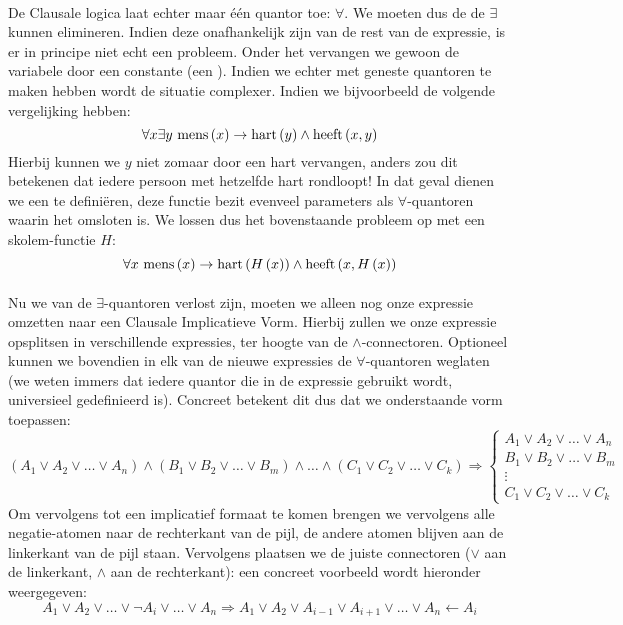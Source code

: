 \paragraph{}De Clausale logica laat echter maar \'e\'en quantor toe: $\forall$. We moeten dus de de $\exists$ kunnen elimineren. Indien deze onafhankelijk zijn van de rest van de expressie, is er in principe niet echt een probleem. Onder het  vervangen we gewoon de variabele door een constante (een ). Indien we echter met geneste quantoren te maken hebben wordt de situatie complexer. Indien we bijvoorbeeld de volgende vergelijking hebben:
\begin{equation}
\forall x\exists y\ \mathfunc{mens}{x}\rightarrow\mathfunc{hart}{y}\wedge\mathfunc{heeft}{x,y}
\end{equation}
Hierbij kunnen we $y$ niet zomaar door een hart vervangen, anders zou dit betekenen dat iedere persoon met hetzelfde hart rondloopt! In dat geval dienen we een  te defini\"eren, deze functie bezit evenveel parameters als $\forall$-quantoren waarin het omsloten is. We lossen dus het bovenstaande probleem op met een skolem-functie $H$:
\begin{equation}
\forall x\ \mathfunc{mens}{x}\rightarrow\mathfunc{hart}{H\left(x\right)}\wedge\mathfunc{heeft}{x,H\left(x\right)}
\end{equation}
\paragraph{}
Nu we van de $\exists$-quantoren verlost zijn, moeten we alleen nog onze expressie omzetten naar een Clausale Implicatieve Vorm. Hierbij zullen we onze expressie opsplitsen in verschillende expressies, ter hoogte van de $\wedge$-connectoren. Optioneel kunnen we bovendien in elk van de nieuwe expressies de $\forall$-quantoren weglaten (we weten immers dat iedere quantor die in de expressie gebruikt wordt, universieel gedefinieerd is). Concreet betekent dit dus dat we onderstaande vorm toepassen:
\begin{equation}
\left(A_1\vee A_2\vee\ldots\vee A_n\right)\wedge\left(B_1\vee B_2\vee\ldots\vee B_m\right)\wedge\ldots\wedge\left(C_1\vee C_2\vee\ldots\vee C_k\right)\Rightarrow\left\{\begin{array}{l}
A_1\vee A_2\vee\ldots\vee A_n\\
B_1\vee B_2\vee\ldots\vee B_m\\
\vdots\\
C_1\vee C_2\vee\ldots\vee C_k
\end{array}\right.
\end{equation}
Om vervolgens tot een implicatief formaat te komen brengen we vervolgens alle negatie-atomen naar de rechterkant van de pijl, de andere atomen blijven aan de linkerkant van de pijl staan. Vervolgens plaatsen we de juiste connectoren ($\vee$ aan de linkerkant, $\wedge$ aan de rechterkant): een concreet voorbeeld wordt hieronder weergegeven:
\begin{equation}
A_1\vee A_2\vee\ldots\vee\neg A_i\vee\ldots\vee A_n\Rightarrow A_1\vee A_2\vee A_{i-1}\vee A_{i+1}\vee\ldots\vee A_n\leftarrow A_i
\end{equation}

